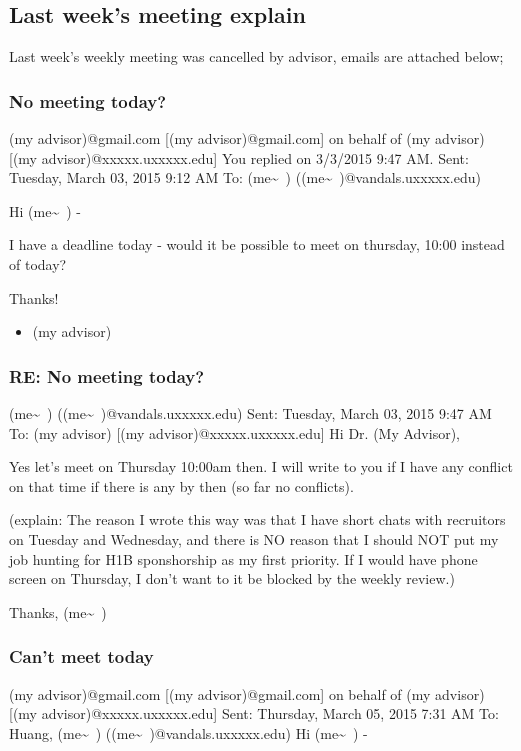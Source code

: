 \documentclass[9pt,b5paper]{article}
\begin{document}
\subsection{Last week's meeting explain}
\label{sec-1-3}
Last week's weekly meeting was cancelled by advisor, emails are attached below;

\subsubsection{No meeting today?}
\label{sec-1-3-1}
(my advisor)@gmail.com [(my advisor)@gmail.com] on behalf of (my advisor) [(my advisor)@xxxxx.uxxxxx.edu]
You replied on 3/3/2015 9:47 AM.
Sent:        Tuesday, March 03, 2015 9:12 AM
To:        (me\textasciitilde{}~) ((me\textasciitilde{}~)@vandals.uxxxxx.edu)

Hi (me\textasciitilde{}~) - 

I have a deadline today - would it be possible to meet on thursday, 10:00 instead of today?

Thanks!

\begin{itemize}
\item (my advisor)
\end{itemize}
\subsubsection{RE: No meeting today?}
\label{sec-1-3-2}
(me\textasciitilde{}~) ((me\textasciitilde{}~)@vandals.uxxxxx.edu)
Sent:        Tuesday, March 03, 2015 9:47 AM
To:        
(my advisor) [(my advisor)@xxxxx.uxxxxx.edu]
Hi Dr. (My Advisor), 

Yes let's meet on Thursday 10:00am then. I will write to you if I have any conflict on that time if there is any by then (so far no conflicts). 

(explain: The reason I wrote this way was that I have short chats with recruitors on Tuesday and Wednesday, and there is NO reason that I should NOT put my job hunting for H1B sponshorship as my first priority. If I would have phone screen on Thursday, I don't want to it be blocked by the weekly review.)

Thanks,
(me\textasciitilde{}~)
\subsubsection{Can't meet today}
\label{sec-1-3-3}
(my advisor)@gmail.com [(my advisor)@gmail.com] on behalf of (my advisor) [(my advisor)@xxxxx.uxxxxx.edu]
Sent:        Thursday, March 05, 2015 7:31 AM
To:        
Huang, (me\textasciitilde{}~) ((me\textasciitilde{}~)@vandals.uxxxxx.edu)
Hi (me\textasciitilde{}~) - 
\end{document}
